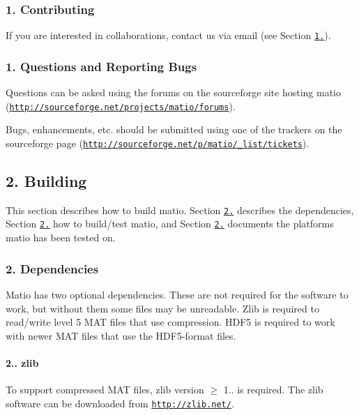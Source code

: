 \subsubsection*{1. Contributing}

If you are interested in collaborations, contact us via email (see Section \href{#11-contact}{\tt 1.}).

\subsubsection*{1. Questions and Reporting Bugs}

Questions can be asked using the forums on the sourceforge site hosting matio (\href{http://sourceforge.net/projects/matio/forums}{\tt http\+://sourceforge.\+net/projects/matio/forums}).

Bugs, enhancements, etc. should be submitted using one of the trackers on the sourceforge page (\href{http://sourceforge.net/p/matio/_list/tickets}{\tt http\+://sourceforge.\+net/p/matio/\+\_\+list/tickets}).

\subsection*{2. Building}

This section describes how to build matio. Section \href{#21-dependencies}{\tt 2.} describes the dependencies, Section \href{#22-building-matio}{\tt 2.} how to build/test matio, and Section \href{#23-platforms}{\tt 2.} documents the platforms matio has been tested on.

\subsubsection*{2. Dependencies}

Matio has two optional dependencies. These are not required for the software to work, but without them some files may be unreadable. Zlib is required to read/write level 5 M\+AT files that use compression. H\+D\+F5 is required to work with newer M\+AT files that use the H\+D\+F5-\/format files.

\paragraph*{2.. zlib}

To support compressed M\+AT files, zlib version {$\ge$} 1.. is required. The zlib software can be downloaded from \href{http://zlib.net/}{\tt http\+://zlib.\+net/}.

